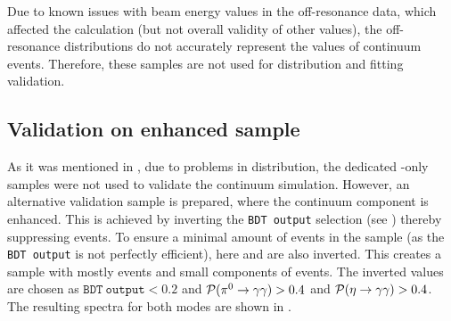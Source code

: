 Due to known issues with beam energy values in the off-resonance data, which affected the \Mbc calculation (but not overall validity of other values), 
the \epem\ra\qqbar off-resonance \Mbc distributions do not accurately represent the \Mbc values of continuum events.
Therefore, these samples are not used for \Mbc distribution and \Mbc fitting validation.

\subsection{Validation on \texorpdfstring{\epem\ra\qqbar}{e+e- -> qqbar} enhanced sample}\label{sec:continuum_mbc_validation}

As it was mentioned in , due to problems in \Mbc distribution, 
the dedicated \epem\ra\qqbar-only samples were not used to validate the continuum simulation.
However, an alternative validation sample is prepared, where the continuum component is enhanced.
This is achieved by inverting the \texttt{BDT~output} selection (see ) thereby suppressing \BB events.
To ensure a minimal amount of \BtoXsgamma events in the sample (as the \texttt{BDT~output} is not perfectly efficient), here \piVeto and \etaVeto
are also inverted.
This creates a sample with mostly \epem\ra\qqbar events and small components of \BB events.
The inverted values are chosen as $\mathtt{BDT~output}<0.2$ and ${\mathcal{P}(\pi^0\rightarrow\gamma\gamma)}>0.4$ and ${\mathcal{P}(\eta\rightarrow\gamma\gamma)}>0.4$.
The resulting \EB spectra for both \FEI modes are shown in .

